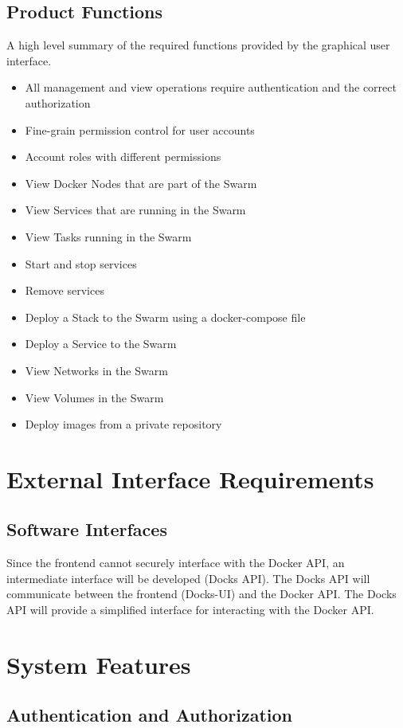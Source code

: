 \documentclass[]{article}
\begin{document}
\subsection{Product Functions}
A high level summary of the required functions provided by the graphical user interface.

\begin{itemize}
	\item All management and view operations require authentication and the correct authorization
	\item Fine-grain permission control for user accounts
	\item Account roles with different permissions
	\item View Docker Nodes that are part of the Swarm
	\item View Services that are running in the Swarm
	\item View Tasks running in the Swarm
	\item Start and stop services
	\item Remove services
	\item Deploy a Stack to the Swarm using a docker-compose file
	\item Deploy a Service to the Swarm
	\item View Networks in the Swarm
	\item View Volumes in the Swarm
	\item Deploy images from a private repository
\end{itemize}

\section{External Interface Requirements}
\subsection{Software Interfaces}
Since the frontend cannot securely interface with the Docker API, an intermediate interface will be developed (Docks API). The Docks API will communicate between the frontend (Docks-UI) and the Docker API. The Docks API will provide a simplified interface for interacting with the Docker API.

\section{System Features}
\subsection{Authentication and Authorization}
\end{document}
